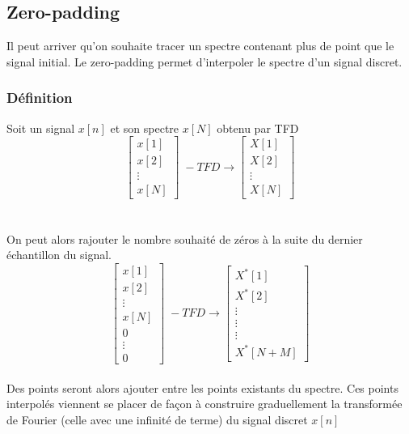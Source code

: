 \documentclass[11pt,a4paper]{article}
\begin{document}
\newpage
\subsection{Zero-padding}
Il peut arriver qu'on souhaite tracer un spectre contenant plus de point que le signal initial. Le zero-padding permet d'interpoler le spectre d'un signal discret.


\subsubsection{Définition}
Soit un signal $x[n]$ et son spectre $x[N]$ obtenu par TFD
\[
\begin{bmatrix} x[1] \\ x[2] \\ \vdots \\ x[N] \end{bmatrix} \; -TFD \rightarrow  
\begin{bmatrix} X[1] \\ X[2] \\ \vdots \\ X[N] \end{bmatrix}
\]\\
\vspace{0.1cm}\\
On peut alors rajouter le nombre souhaité de zéros à la suite du dernier échantillon du signal.
\[
\begin{bmatrix} x[1] \\ x[2] \\ \vdots \\ x[N] \\ 0 \\ \vdots \\ 0 \end{bmatrix} \; -TFD \rightarrow  
\begin{bmatrix} X^*[1] \\ X^*[2] \\ \vdots \\  \vdots \\  \vdots \\ X^*[N+M] \end{bmatrix}
\]\\

Des points seront alors ajouter entre les points existants du spectre. Ces points interpolés viennent se placer de façon à construire graduellement la transformée de Fourier (celle avec une infinité de terme) du signal discret $x[n]$
\end{document}
